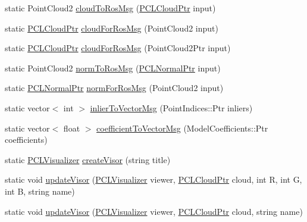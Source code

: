 \begin{DoxyCompactItemize}
\item 
static Point\-Cloud2 \hyperlink{classpcm_1_1PCManager_a9ec6cf99c0c34c9761fd923aace594dc}{cloud\-To\-Ros\-Msg} (\hyperlink{pc__primitive_8h_aa14a240c8d999c4f56133c0f70e88783}{P\-C\-L\-Cloud\-Ptr} input)
\item 
static \hyperlink{pc__primitive_8h_aa14a240c8d999c4f56133c0f70e88783}{P\-C\-L\-Cloud\-Ptr} \hyperlink{classpcm_1_1PCManager_acb513ed7a3b898e398fd211bafac6f6a}{cloud\-For\-Ros\-Msg} (Point\-Cloud2 input)
\item 
static \hyperlink{pc__primitive_8h_aa14a240c8d999c4f56133c0f70e88783}{P\-C\-L\-Cloud\-Ptr} \hyperlink{classpcm_1_1PCManager_aea4756e187ee152c8695dc3e7496562e}{cloud\-For\-Ros\-Msg} (Point\-Cloud2\-Ptr input)
\item 
static Point\-Cloud2 \hyperlink{classpcm_1_1PCManager_aad8d4dd6c1bb761213134760be5673c3}{norm\-To\-Ros\-Msg} (\hyperlink{pc__primitive_8h_a1bc38ce8b0c26e5f2d28fae9f3e3ea97}{P\-C\-L\-Normal\-Ptr} input)
\item 
static \hyperlink{pc__primitive_8h_a1bc38ce8b0c26e5f2d28fae9f3e3ea97}{P\-C\-L\-Normal\-Ptr} \hyperlink{classpcm_1_1PCManager_a75f790855ce87d24293bb3a8e4a453c9}{norm\-For\-Ros\-Msg} (Point\-Cloud2 input)
\item 
static vector$<$ int $>$ \hyperlink{classpcm_1_1PCManager_ab473f60dc622465a1c3ff77000f0803f}{inlier\-To\-Vector\-Msg} (Point\-Indices\-::\-Ptr inliers)
\item 
static vector$<$ float $>$ \hyperlink{classpcm_1_1PCManager_a79353f94b8396268bea0a1358c260421}{coefficient\-To\-Vector\-Msg} (Model\-Coefficients\-::\-Ptr coefficients)
\item 
static \hyperlink{pc__manager_8h_a38c805dbc7ad6f06109b85c8e540817a}{P\-C\-L\-Visualizer} \hyperlink{classpcm_1_1PCManager_a23d8e95e891a3330785375e6672ec1fe}{create\-Visor} (string title)
\item 
static void \hyperlink{classpcm_1_1PCManager_a8b6dfcce0709c29f63a82c4dfa6ef6e6}{update\-Visor} (\hyperlink{pc__manager_8h_a38c805dbc7ad6f06109b85c8e540817a}{P\-C\-L\-Visualizer} viewer, \hyperlink{pc__primitive_8h_aa14a240c8d999c4f56133c0f70e88783}{P\-C\-L\-Cloud\-Ptr} cloud, int R, int G, int B, string name)
\item 
static void \hyperlink{classpcm_1_1PCManager_af6498d518bd4eb1ad5f724849a851e90}{update\-Visor} (\hyperlink{pc__manager_8h_a38c805dbc7ad6f06109b85c8e540817a}{P\-C\-L\-Visualizer} viewer, \hyperlink{pc__primitive_8h_aa14a240c8d999c4f56133c0f70e88783}{P\-C\-L\-Cloud\-Ptr} cloud, string name)
\item 

\end{DoxyCompactItemize}
